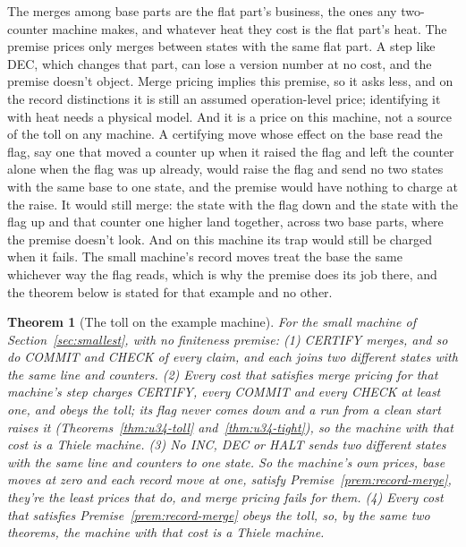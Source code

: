 \documentclass[11pt,twoside]{article}
\theoremstyle{thielethm}
\newtheorem{theorem}{Theorem}[section]
\theoremstyle{thieledef}
\theoremstyle{thieledef}
\theoremstyle{thieledef}
\theoremstyle{thielethm}
\theoremstyle{thieleobs}
\theoremstyle{thielethm}
\begin{document}
The merges among base parts are the flat part's business, the ones any two-counter machine
makes, and whatever heat they cost is the flat part's heat. The premise prices only merges
between states with the same flat part. A step like DEC, which changes that part, can
lose a version number at no cost, and the premise doesn't object. Merge pricing implies this
premise, so it asks less, and on the record distinctions it is still an assumed operation-level price; identifying
it with heat needs a physical model. And it is a price on this machine, not a source of the toll on
any machine. A certifying move whose effect on the base read the flag, say one that moved a
counter up when it raised the flag and left the counter alone when the flag was up already, would raise the flag and send no two states with the same base to one state, and the premise would have nothing to charge at the raise. It would still merge: the state with the flag down and the state with the flag up and that counter one higher land together, across two base parts, where the premise doesn't look. And on this machine its trap would still be charged when it fails. The small
machine's record moves treat the base the same whichever way the flag reads, which is why the
premise does its job there, and the theorem below is stated for that example and no other.

\begin{theorem}[The toll on the example machine]\label{thm:record-merge-toll}
For the small machine of Section~\ref{sec:smallest}, with no finiteness premise: (1) CERTIFY merges, and so do COMMIT and CHECK of every claim, and each joins two different states with the same line and counters. (2) Every cost that satisfies merge pricing for that machine's step charges CERTIFY, every COMMIT and every CHECK at least one, and obeys the toll; its flag never
comes down and a run from a clean start raises it (Theorems~\ref{thm:u34-toll} and~\ref{thm:u34-tight}),
so the machine with that cost is a Thiele machine. (3) No INC, DEC or HALT sends two different states with the same line and counters to one
state. So the machine's own prices, base moves at zero and each record move at one, satisfy Premise~\ref{prem:record-merge}, they're the least prices that do, and merge pricing fails for them. (4) Every cost that satisfies
Premise~\ref{prem:record-merge} obeys the toll, so, by the same two theorems, the machine with
that cost is a Thiele machine.
\end{theorem}
\end{document}
